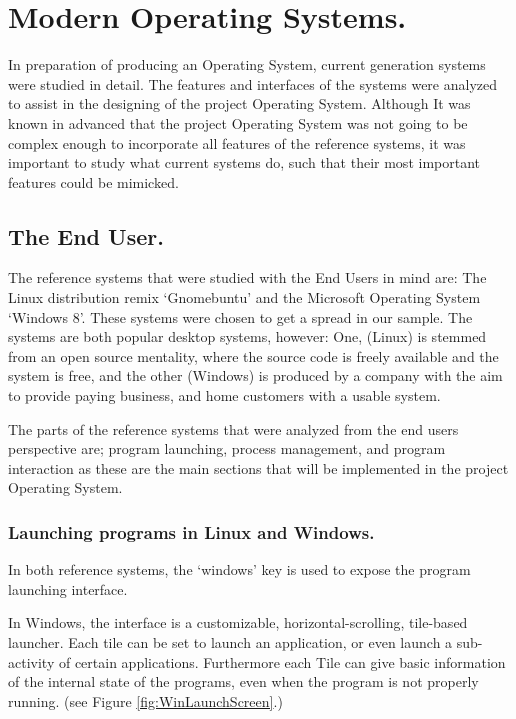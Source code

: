 \documentclass[a4paper]{report}
\begin{document}
\clearpage
\section*{Modern Operating Systems.}

In preparation of producing an Operating System, current generation systems were studied in detail. The features and interfaces of the systems were analyzed to assist in the designing of the project Operating System. Although It was known in advanced that the project Operating System was not going to be complex enough to incorporate all features of the reference systems, it was important to study what current systems do, such that their most important features could be mimicked.

\subsection*{The End User.}
The reference systems that were studied with the End Users in mind are: The Linux distribution remix `Gnomebuntu' and the Microsoft Operating System `Windows 8'. These systems were chosen to get a spread in our sample. The systems are both popular desktop systems, however: One, (Linux) is stemmed from an open source mentality, where the source code is freely available and the system is free, and the other (Windows) is produced by a company with the aim to provide paying business, and home customers with a usable system.

The parts of the reference systems that were analyzed from the end users perspective are; program launching, process management, and program interaction as these are the main sections that will be implemented in the project Operating System.

\subsubsection*{Launching programs in Linux and Windows.}

In both reference systems, the `windows' key is used to expose the program launching interface.

In Windows, the interface is a customizable, horizontal-scrolling, tile-based launcher. Each tile can be set to launch an application, or even launch a sub-activity of certain applications. Furthermore each Tile can give basic information of the internal state of the programs, even when the program is not properly running. (see Figure \ref{fig:WinLaunchScreen}.)
\end{document}

